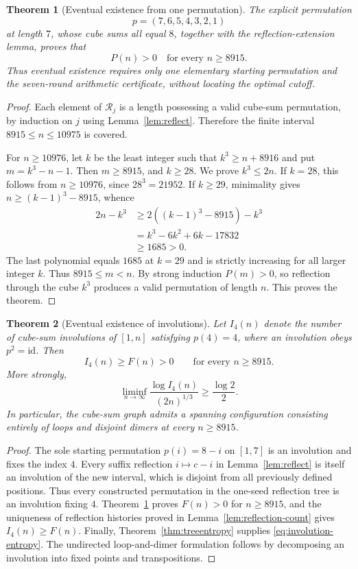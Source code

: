 \documentclass[10pt]{article}
\newtheorem{theorem}{Theorem}
\begin{document}
\begin{theorem}[Eventual existence from one permutation]
\label{thm:single-seed}
The explicit permutation
\[
\boxed{p=(7,6,5,4,3,2,1)}
\]
at length $7$, whose cube sums all equal
$8$, together with the reflection-extension
lemma, proves that
\[
\boxed{P(n)>0\quad\text{for every }n\ge8915.}
\]
Thus eventual existence requires only one
elementary starting permutation and
the seven-round arithmetic certificate,
without locating the optimal cutoff.
\end{theorem}
\begin{proof}
Each element of $\mathcal R_j$ is a
length possessing a valid cube-sum
permutation, by induction on $j$
using Lemma~\ref{lem:reflect}.
Therefore the finite interval
$8915\le n\le10975$ is covered.

For $n\ge10976$, let $k$ be the
least integer such that
$k^3\ge n+8916$ and put
$m=k^3-n-1$. Then $m\ge8915$,
and $k\ge28$.
We prove $k^3\le2n$.
If $k=28$, this follows from
$n\ge10976$, since $28^3=21952$.
If $k\ge29$, minimality gives
$n\ge(k-1)^3-8915$, whence
\[
\begin{aligned}
2n-k^3
&\ge 2((k-1)^3-8915)-k^3\\
&=k^3-6k^2+6k-17832\\
&\ge1685>0.
\end{aligned}
\]
The last polynomial equals $1685$
at $k=29$ and is strictly increasing
for all larger integer $k$.
Thus $8915\le m<n$.
By strong induction $P(m)>0$,
so reflection through the cube $k^3$
produces a valid permutation of length
$n$. This proves the theorem.
\end{proof}

\begin{theorem}[Eventual existence of involutions]
\label{thm:involution-tail}
Let $I_4(n)$ denote the number of
cube-sum \emph{involutions} of $[1,n]$
satisfying $p(4)=4$, where an
involution obeys $p^2=\mathrm{id}$.
Then
\[
\boxed{I_4(n)\ge F(n)>0
\qquad\text{for every }n\ge8915.}
\]
More strongly,
\begin{equation}\label{eq:involution-entropy}
\boxed{\displaystyle
\liminf_{n\to\infty}
\frac{\log I_4(n)}{(2n)^{1/3}}
\ge\frac{\log2}{2}.}
\end{equation}
In particular, the cube-sum graph
admits a spanning configuration
consisting entirely of loops and
disjoint dimers at every $n\ge8915$.
\end{theorem}
\begin{proof}
The sole starting permutation
$p(i)=8-i$ on $[1,7]$ is an
involution and fixes the index $4$.
Every suffix reflection $i\mapsto
c-i$ in Lemma~\ref{lem:reflect}
is itself an involution of the new
interval, which is disjoint from
all previously defined positions.
Thus every constructed permutation
in the one-seed reflection tree
is an involution fixing $4$.
Theorem~\ref{thm:single-seed}
proves $F(n)>0$ for $n\ge8915$,
and the uniqueness of reflection
histories proved in
Lemma~\ref{lem:reflection-count}
gives $I_4(n)\ge F(n)$.
Finally, Theorem~\ref{thm:treeentropy}
supplies \eqref{eq:involution-entropy}.
The undirected loop-and-dimer
formulation follows by decomposing
an involution into fixed points and
transpositions.
\end{proof}
\end{document}
